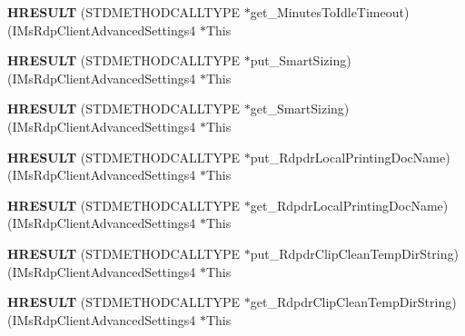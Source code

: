 \begin{DoxyCompactItemize}
{\bfseries H\+R\+E\+S\+U\+LT} (S\+T\+D\+M\+E\+T\+H\+O\+D\+C\+A\+L\+L\+T\+Y\+PE $\ast$get\+\_\+\+Minutes\+To\+Idle\+Timeout)(I\+Ms\+Rdp\+Client\+Advanced\+Settings4 $\ast$This
\item 
\mbox{\label{struct_i_ms_rdp_client_advanced_settings4_vtbl_a590116766c031bd74d2e2097d91de0bc}} 
{\bfseries H\+R\+E\+S\+U\+LT} (S\+T\+D\+M\+E\+T\+H\+O\+D\+C\+A\+L\+L\+T\+Y\+PE $\ast$put\+\_\+\+Smart\+Sizing)(I\+Ms\+Rdp\+Client\+Advanced\+Settings4 $\ast$This
\item 
\mbox{\label{struct_i_ms_rdp_client_advanced_settings4_vtbl_a04dc172f593385b87557fe3a00b68e71}} 
{\bfseries H\+R\+E\+S\+U\+LT} (S\+T\+D\+M\+E\+T\+H\+O\+D\+C\+A\+L\+L\+T\+Y\+PE $\ast$get\+\_\+\+Smart\+Sizing)(I\+Ms\+Rdp\+Client\+Advanced\+Settings4 $\ast$This
\item 
\mbox{\label{struct_i_ms_rdp_client_advanced_settings4_vtbl_adc9a5b4904e927f5ee1bcba60bd3fb38}} 
{\bfseries H\+R\+E\+S\+U\+LT} (S\+T\+D\+M\+E\+T\+H\+O\+D\+C\+A\+L\+L\+T\+Y\+PE $\ast$put\+\_\+\+Rdpdr\+Local\+Printing\+Doc\+Name)(I\+Ms\+Rdp\+Client\+Advanced\+Settings4 $\ast$This
\item 
\mbox{\label{struct_i_ms_rdp_client_advanced_settings4_vtbl_a25eb21634cc3b09de468d5ff41e8c8b8}} 
{\bfseries H\+R\+E\+S\+U\+LT} (S\+T\+D\+M\+E\+T\+H\+O\+D\+C\+A\+L\+L\+T\+Y\+PE $\ast$get\+\_\+\+Rdpdr\+Local\+Printing\+Doc\+Name)(I\+Ms\+Rdp\+Client\+Advanced\+Settings4 $\ast$This
\item 
\mbox{\label{struct_i_ms_rdp_client_advanced_settings4_vtbl_ac53562146e638fe7dda70e997e009534}} 
{\bfseries H\+R\+E\+S\+U\+LT} (S\+T\+D\+M\+E\+T\+H\+O\+D\+C\+A\+L\+L\+T\+Y\+PE $\ast$put\+\_\+\+Rdpdr\+Clip\+Clean\+Temp\+Dir\+String)(I\+Ms\+Rdp\+Client\+Advanced\+Settings4 $\ast$This
\item 
\mbox{\label{struct_i_ms_rdp_client_advanced_settings4_vtbl_a16509a04a76a40bdfaaa4c379be49e47}} 
{\bfseries H\+R\+E\+S\+U\+LT} (S\+T\+D\+M\+E\+T\+H\+O\+D\+C\+A\+L\+L\+T\+Y\+PE $\ast$get\+\_\+\+Rdpdr\+Clip\+Clean\+Temp\+Dir\+String)(I\+Ms\+Rdp\+Client\+Advanced\+Settings4 $\ast$This

\end{DoxyCompactItemize}

